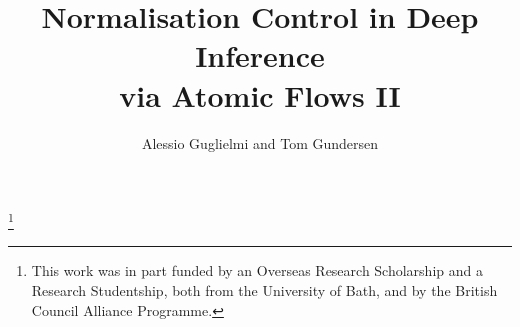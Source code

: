 \documentclass[a4paper]{amsart}
\theoremstyle{remark}
\theoremstyle{definition}
\begin{document}
\title[Normalisation Control in Deep Inference   via Atomic Flows II]
      {Normalisation Control in Deep Inference\\ via Atomic Flows II}

\author{Alessio Guglielmi and Tom Gundersen}

\thanks{This work was in part funded by an Overseas Research Scholarship and a Research Studentship, both from the University of Bath, and by the British Council Alliance Programme.}




\maketitle

\newcommand{\ot}{\mathbin\shortleftarrow}
\newcommand{\fff}{\mathsf f}
\newcommand{\ttt}{\mathsf t}
\newcommand{\ai}{\mathsf{ai}}
\newcommand{\aw}{\mathsf{aw}}
\newcommand{\ac}{\mathsf{ac}}
\newcommand{\aid}{{\ai{\downarrow}}}
\newcommand{\awd}{{\aw{\downarrow}}}
\newcommand{\acd}{{\ac{\downarrow}}}
\newcommand{\aiu}{{\ai{\uparrow}}}
\newcommand{\awu}{{\aw{\uparrow}}}
\newcommand{\acu}{{\ac{\uparrow}}}
\newcommand{\swi}{\mathsf{s}}
\newcommand{\med}{\mathsf{m}}
\newcommand{\sus}{\mathsf{ss}}
\newcommand{\said}{\mathsf{s}\aid}
\newcommand{\contr}{\mathsf{c}}
\newcommand{\cod}{{\contr{\downarrow}}}
\newcommand{\cou}{{\contr{\uparrow}}}
\newcommand{\SKS}{\mathsf{SKS}}
\newcommand{\ppl  }{{\mathchoice{\scriptstyle+}
                                {\scriptstyle+}
                                {\scriptstyle+}
                                {\scriptscriptstyle+}}}
\newcommand{\pmi  }{{\mathchoice{\scriptstyle-}
                                {\scriptstyle-}
                                {\scriptstyle-}
                                {\scriptscriptstyle-}}}
\end{document}
